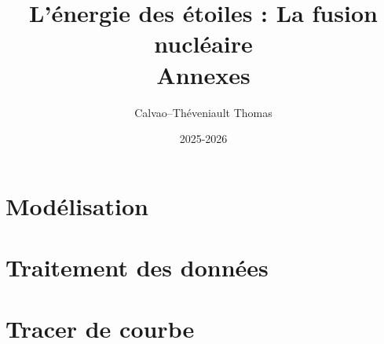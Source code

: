 \documentclass[titlepage]{article}
\begin{document}
\pagestyle{fancy}
\fancyfoot[C]{}

\begin{titlepage}
    {\title{{\Huge L'énergie des étoiles : La fusion nucléaire} \\ Annexes}}
    \author{Calvao--Théveniault Thomas}
    \date{2025-2026}
    \maketitle
\end{titlepage}

\section{Modélisation}



\section{Traitement des données}



\section{Tracer de courbe}



\label{end}
\end{document}
